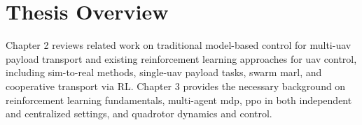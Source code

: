\section{Thesis Overview}
Chapter 2 reviews related work on traditional model-based control for multi-\gls{uav} payload transport and existing reinforcement learning approaches for \gls{uav} control, including sim-to-real methods, single-\gls{uav} payload tasks, swarm \gls{marl}, and cooperative transport via RL. Chapter 3 provides the necessary background on reinforcement learning fundamentals, multi-agent \gls{mdp}, \gls{ppo} in both independent and centralized settings, and quadrotor dynamics and control. 